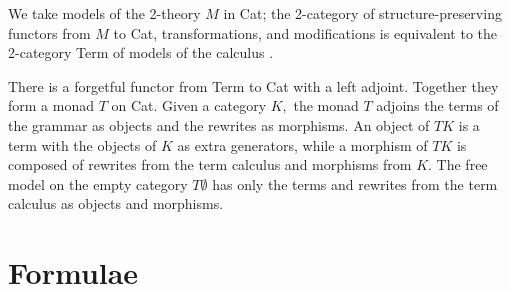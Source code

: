 \documentclass[]{acm_proc_article-sp}
\numberwithin{equation}{subsection}
\begin{document}
We take models of the 2-theory $M$ in Cat; the 2-category of structure-preserving functors
from $M$ to Cat, transformations, and modifications is equivalent to
the 2-category Term of models of the calculus \cite{somebody}.

There is a forgetful functor from Term to Cat with a left adjoint.
Together they form a monad $T$ on Cat.  Given a category $K,$ the
monad $T$ adjoins the terms of the grammar as objects and the
rewrites as morphisms.  An object of $TK$ is a term with the objects
of $K$ as extra generators, while a morphism of $TK$ is composed
of rewrites from the term calculus and morphisms from $K$. The
free model on the empty category $T\emptyset$ has only the terms
and rewrites from the term calculus as objects and morphisms.

\section{Formulae}

\begin{comment}
  * Interpretation of formulae as sets of terms satisfying the formulae

      * set aside what formulae are for the moment

      * data structures have only invertible 2-morphisms

          * e.g. sets are lists mod permutation and duplicate idempotence

      * set comprehension as monad

      * generalize from sets to arbitrary collection, so "sets of terms" is CT

  * Formulae are (T+C)*

  * distributive law

      * (T+C)* -> CT

          * T -> CT via unit of C

          * C -> TC via unit of T

          * TT->T, CC->C via multiplications

          * TC -> CT via distributive law

              * e.g. ({S, K} {a, b, c}) ↦ {(S a), (S b), (S c), (K a), (K b), (K c)}

  * Add modal operators to formulae

      * K is collection of 2-hole contexts using same collection monad

          * A <K> B = { t | ∃u ∈ [| A |], v ∈ [| B |], ρ: K(t, u) -> v}

              * e.g. in SKI or lambda, 
                A => B = { t | ∃u ∈ [| A |], v ∈ [| B |], ρ: (t u) -> v} = A <( )> B

                  * Need to think about reduction contexts here: are all t of the form Rt'?  I guess we can express sets of terms that do not involve R.

              * e.g. in pi calc
                A ▷ B = { t | ∃u ∈ [| A |], v ∈ [| B |], ρ: t | u -> v} = A <|> B

                  * Ditto for COMM

          * Stuff from LICS paper above
\end{comment}
\end{document}
